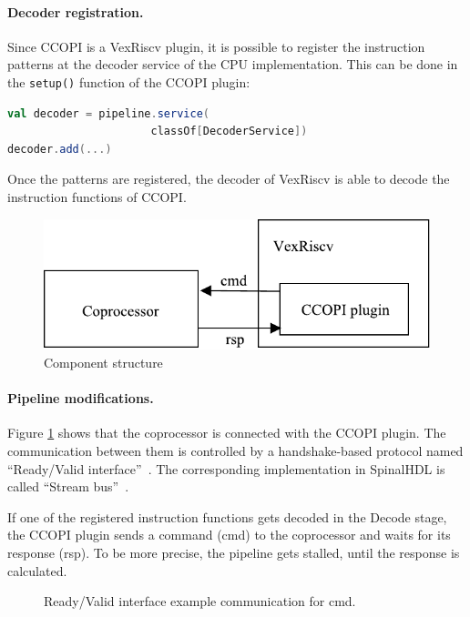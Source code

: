 \documentclass[twoside,twocolumn]{article}
\newcommand{\code}[1]{\texttt{#1}}
\begin{document}
\paragraph{Decoder registration.} Since CCOPI is a VexRiscv plugin,
it is possible to register the
instruction patterns at the decoder service of the CPU implementation.
This can be done in the \code{setup()} function of the CCOPI plugin:
\begin{lstlisting}[language=scala]
val decoder = pipeline.service(
                      classOf[DecoderService])
decoder.add(...)
\end{lstlisting}
Once the patterns are registered, the decoder of VexRiscv is able to
decode the instruction functions of CCOPI.

\begin{figure}[ht]
    \includegraphics[scale=0.68]{ccopi_plugin}
    \caption{Component structure}
    \label{fig:component_structure}
\end{figure}

\paragraph{Pipeline modifications.}
Figure \ref*{fig:component_structure} shows that the coprocessor 
is connected with the CCOPI plugin. The communication between them 
is controlled
by a handshake-based protocol named ``Ready/Valid
interface''~\cite{ready_valid}. The
corresponding implementation in SpinalHDL is called ``Stream
bus''~\cite{spinal_doc3}. 

If one of the registered instruction functions gets decoded in the
Decode stage, the CCOPI plugin sends a command (cmd) to the
coprocessor and waits for its response (rsp). To be more precise, the
pipeline gets stalled, until the response is calculated.
\begin{figure}[h]
    
    \caption{Ready/Valid interface example communication for cmd.}
    \label{fig:ready_valid}
\end{figure}
\end{document}
